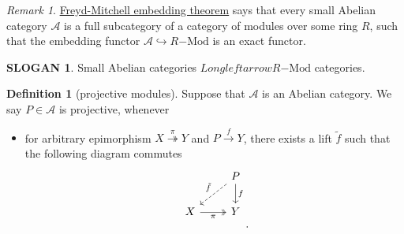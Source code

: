 \documentclass{MainStyle}
\theoremstyle{definition}
\theoremstyle{definition}
\newtheorem{slogan}{SLOGAN}
\theoremstyle{definition}
\newtheorem{definition}{Definition}
\theoremstyle{definition}
\theoremstyle{definition}
\theoremstyle{definition}
\theoremstyle{remark}
\newtheorem{remark}{Remark}
\theoremstyle{remark}
\begin{document}
\begin{remark}
    \href{https://ncatlab.org/nlab/show/Freyd-Mitchell+embedding+theorem}{Freyd-Mitchell embedding theorem} says that every small Abelian category $\mathcal A$ is a full subcategory of a category of modules over some ring $R$, such that the embedding functor $\mathcal A\hookrightarrow R\mathrm{-Mod}$ is an exact functor.
\end{remark}

\begin{slogan}
    Small Abelian categories $Longleftarrow R\mathrm{-Mod}$ categories.
\end{slogan}

\begin{definition}[projective modules]
    Suppose that $\mathcal A$ is an Abelian category. We say $P\in \mathcal A$ is projective, whenever
    \begin{itemize}
        \item for arbitrary epimorphism $X\overset \pi\twoheadrightarrow Y$ and $P\overset f\to Y$, there exists a lift $\tilde f$ such that the following diagram commutes
              \[\begin{tikzcd}
                      & P \\
                      X & Y \\
                      \\
                      \\
                      & {}
                      \arrow["\pi"', two heads, from=2-1, to=2-2]
                      \arrow["{\tilde f}"', dashed, from=1-2, to=2-1]
                      \arrow["f", from=1-2, to=2-2]
                  \end{tikzcd}.\]
    \end{itemize}
\end{definition}
\end{document}
